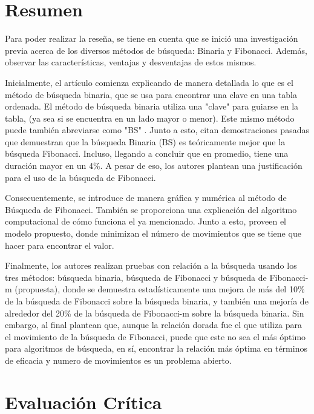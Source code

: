 \documentclass{article}
\begin{document}
\section{Resumen}

Para poder realizar la reseña, se tiene en cuenta que se inició una investigación previa acerca de los diversos métodos de búsqueda: Binaria y Fibonacci. Además, observar las características, ventajas y desventajas de estos mismos.

Inicialmente, el artículo comienza explicando de manera detallada lo que es el método de búsqueda binaria, que se usa para encontrar una clave en una tabla ordenada. El método de búsqueda binaria utiliza una "clave" para guiarse en la tabla, (ya sea si se encuentra en un lado mayor o menor). Este mismo método puede también abreviarse como "BS" \cite{overholt1973optimal}. Junto a esto, citan demostraciones pasadas que demuestran que la búsqueda Binaria (BS) es teóricamente mejor que la búsqueda Fibonacci. Incluso, llegando a concluir que en promedio, tiene una duración mayor en un 4\%. A pesar de eso, los autores plantean una justificación para el uso de la búsqueda de Fibonacci.

Consecuentemente, se introduce de manera gráfica y numérica al método de Búsqueda de Fibonacci. También se proporciona una explicación del algoritmo computacional de cómo funciona el ya mencionado. Junto a esto, proveen el modelo propuesto, donde minimizan el número de movimientos que se tiene que hacer para encontrar el valor. 

Finalmente, los autores realizan pruebas con relación a la búsqueda usando los tres métodos: búsqueda binaria, búsqueda de Fibonacci y búsqueda de Fibonacci-m (propuesta), donde se demuestra estadísticamente una mejora de más del 10\% de la búsqueda de Fibonacci sobre la búsqueda binaria, y también una mejoría de alrededor del 20\% de la búsqueda de Fibonacci-m sobre la búsqueda binaria. Sin embargo, al final plantean que, aunque la relación dorada fue el que utiliza para el movimiento de la búsqueda de Fibonacci, puede que este no sea el más óptimo para algoritmos de búsqueda, en sí, encontrar la relación más óptima en términos de eficacia y numero de movimientos es un problema abierto.



\section{Evaluación Crítica}
\end{document}
